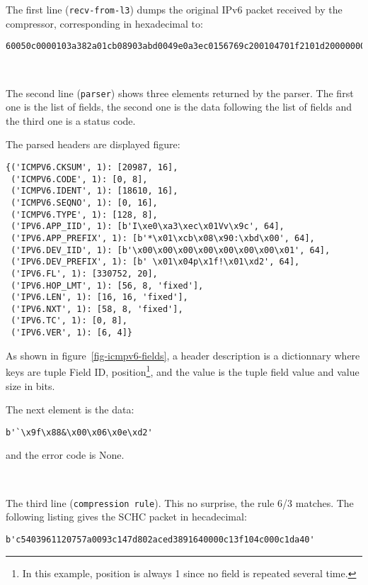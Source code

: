 \documentclass[onecolumn,12pt]{book}
\newcounter{c}
\begin{document}
The first line (\texttt{recv-from-l3}) dumps the original IPv6 packet received by the compressor, corresponding in hexadecimal to:

\begin{lstlisting}[basicstyle=\ttfamily\tiny]
60050c0000103a382a01cb08903abd0049e0a3ec0156769c200104701f2101d20000000000000001800051fb48b20000609f882600060ed2
\end{lstlisting}

~  

The second line (\texttt{parser}) shows three elements returned by the parser. The first one is the list of fields, the second one is the data following the list of fields and the third one is a status code.

The parsed headers are displayed figure:

\begin{lstlisting}[caption={Header Fields of an ICMPv6 message}, label=fig-icmpv6-fields]
{('ICMPV6.CKSUM', 1): [20987, 16],
 ('ICMPV6.CODE', 1): [0, 8],
 ('ICMPV6.IDENT', 1): [18610, 16],
 ('ICMPV6.SEQNO', 1): [0, 16],
 ('ICMPV6.TYPE', 1): [128, 8],
 ('IPV6.APP_IID', 1): [b'I\xe0\xa3\xec\x01Vv\x9c', 64],
 ('IPV6.APP_PREFIX', 1): [b'*\x01\xcb\x08\x90:\xbd\x00', 64],
 ('IPV6.DEV_IID', 1): [b'\x00\x00\x00\x00\x00\x00\x00\x01', 64],
 ('IPV6.DEV_PREFIX', 1): [b' \x01\x04p\x1f!\x01\xd2', 64],
 ('IPV6.FL', 1): [330752, 20],
 ('IPV6.HOP_LMT', 1): [56, 8, 'fixed'],
 ('IPV6.LEN', 1): [16, 16, 'fixed'],
 ('IPV6.NXT', 1): [58, 8, 'fixed'],
 ('IPV6.TC', 1): [0, 8],
 ('IPV6.VER', 1): [6, 4]}
\end{lstlisting}

As shown in figure~\vref{fig-icmpv6-fields}, a header description is a dictionnary where keys are tuple Field ID, position\footnote{In this example, position is always 1 since no field is repeated several time.}, and the value is the tuple field value and value size in bits.

The next element is the data:

\begin{lstlisting}
b'`\x9f\x88&\x00\x06\x0e\xd2'
\end{lstlisting}

and the error code is None.

~~

The third line (\texttt{compression rule}). This no surprise, the rule 6/3 matches. The following listing gives the SCHC packet in hecadecimal:


\begin{lstlisting}
b'c5403961120757a0093c147d802aced3891640000c13f104c000c1da40'
\end{lstlisting}
\end{document}

